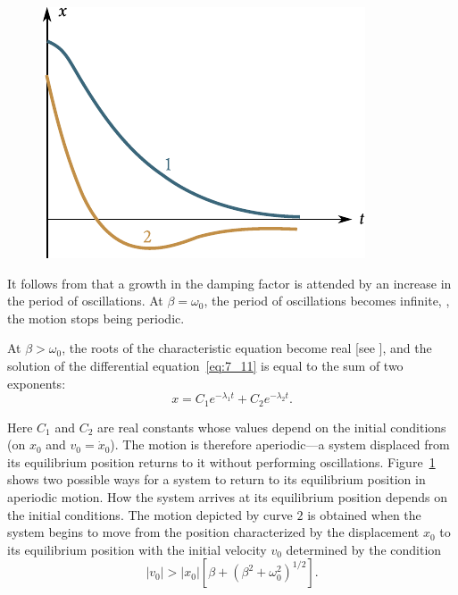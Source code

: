 \begin{figure}[t]
	\begin{center}
		\includegraphics[scale=0.95]{figures/ch_07/fig_7_20.pdf}
		\caption[]{}
		\label{fig:7_20}
	\end{center}
	\vspace{-0.8cm}
\end{figure}

It follows from  that a growth in the damping factor is attended by an increase in the period of oscillations. At $\beta=\omega_0$, the period of oscillations becomes infinite, \ie, the motion stops being periodic.

At $\beta>\omega_0$, the roots of the characteristic equation become real [see ], and the solution of the differential equation~\eqref{eq:7_11} is equal to the sum of two exponents:
\begin{equation*}
	x = C_1e^{-\lambda_1 t} + C_2e^{-\lambda_2 t}.
\end{equation*}

\noindent
Here $C_1$ and $C_2$ are real constants whose values depend on the initial conditions (on $x_0$ and $v_0=\dot{x}_0$). The motion is therefore aperiodic---a system displaced from its equilibrium position returns to it without performing oscillations. Figure~\ref{fig:7_20} shows two possible ways for a system to return to its equilibrium position in aperiodic motion. How the system arrives at its equilibrium position depends on the initial conditions. The motion depicted by curve $2$ is obtained when the system begins to move from the position characterized by the displacement $x_0$ to its equilibrium position with the initial velocity $v_0$ determined by the condition
\begin{equation}\label{eq:7_110}
	|v_0| > |x_0|\left[\beta + \left(\beta^2 + \omega_0^2\right)^{1/2}\right].
\end{equation}

